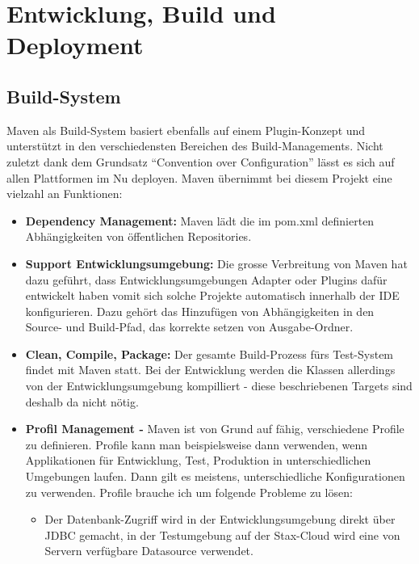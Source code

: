 \chapter{Entwicklung, Build und Deployment}

\section{Build-System}Maven als Build-System basiert ebenfalls auf einem Plugin-Konzept und unterst\"utzt in den verschiedensten Bereichen des Build-Managements. Nicht zuletzt dank dem Grundsatz ``Convention over Configuration'' l\"asst es sich auf allen Plattformen im Nu deployen. Maven \"ubernimmt bei diesem Projekt eine vielzahl an Funktionen:

\begin{itemize}
\item \textbf{Dependency Management: } Maven l\"adt die im pom.xml definierten Abh\"angigkeiten von \"offentlichen Repositories. 
\item \textbf{Support Entwicklungsumgebung:  } Die grosse Verbreitung von Maven hat dazu gef\"uhrt, dass Entwicklungsumgebungen Adapter oder Plugins daf\"ur entwickelt haben vomit sich solche Projekte automatisch innerhalb der IDE konfigurieren. Dazu geh\"ort das Hinzuf\"ugen von Abh\"angigkeiten in den Source- und Build-Pfad, das korrekte setzen von Ausgabe-Ordner. 
\item \textbf{Clean, Compile, Package: }Der gesamte Build-Prozess f\"urs Test-System findet mit Maven statt. Bei der Entwicklung werden die Klassen allerdings von der Entwicklungsumgebung kompilliert - diese beschriebenen Targets sind deshalb da nicht n\"otig. 
\item \textbf{Profil Management - } Maven ist von Grund auf f\"ahig, verschiedene Profile zu definieren. Profile kann man beispielsweise dann verwenden, wenn Applikationen f\"ur Entwicklung, Test, Produktion in unterschiedlichen Umgebungen laufen. Dann gilt es meistens, unterschiedliche Konfigurationen zu verwenden. Profile brauche ich um folgende Probleme zu l\"osen:\begin{itemize}
\item Der Datenbank-Zugriff wird in der Entwicklungsumgebung direkt \"uber JDBC gemacht, in der Testumgebung auf der Stax-Cloud wird eine von Servern verf\"ugbare Datasource verwendet.
\end{itemize}
\end{itemize}
